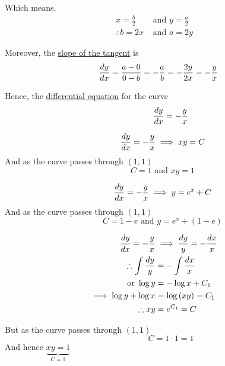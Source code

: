 \documentclass[14pt,fleqn]{extarticle}
\begin{document}
\begin{question}
\begin{step}
       Which means, 
       \begin{align}
       x = \frac{b}{2}&\text{ and } y = \frac{a}{2} \\
       \therefore b = 2x&\text{ and } a = 2y 
\end{align}

Moreover, the \underline{slope of the tangent} is 
\[ \quad \frac{dy}{dx} = \dfrac{a-0}{0-b} = -\frac{a}{b} = -\frac{2y}{2x} = -\frac{y}{x}\]

Hence, the \underline{differential equation} for the curve
\[ \qquad\qquad \frac{dy}{dx} = -\frac{y}{x}\]
\end{step}

\begin{step}
  \begin{options} 
     \correct 
       \[ \qquad\frac{dy}{dx} = -\frac{y}{x}\implies xy = C \]
       And as the curve passes through $(1,1)$
       \[ \qquad C =1\text{ and } xy = 1\]
     \incorrect
     
       \[ \qquad\frac{dy}{dx} = -\frac{y}{x}\implies y = e^x + C \]
       And as the curve passes through $(1,1)$
       \[ \qquad C = 1-e \text{ and } y = e^x + (1-e) \]
        
    \end{options} 
     \reason 
       
       \begin{align}
       \frac{dy}{dx} = -\frac{y}{x} &\implies \frac{dy}{y} = -\frac{dx}{x} \\
       \therefore \int\frac{dy}{y} &= -\int\frac{dx}{x} \\
       \text{or } \log y &= -\log x + C_1 \\
       \implies \log y + \log x &= \log \left(xy \right) = C_1 \\
       \therefore xy &= e^{C_1} = C 
\end{align}

       But as the curve passes through $(1,1)$
       \[ \qquad\qquad C = 1\cdot 1 = 1\]
       And hence $\underbrace{xy = 1}_{C = 1}$
\end{step}
\end{question} 
\end{document}
